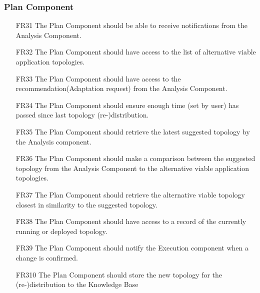 \subsubsection{\textbf{Plan Component}}
\begin{itemize}
    \item [FR31] The Plan Component should be able to receive notifications from the Analysis Component.
    \item [FR32] The Plan Component should have access to the list of alternative viable application topologies.
    \item [FR33] The Plan Component should have access to the recommendation(Adaptation request) from the Analysis Component.
    \item [FR34] The Plan Component should ensure enough time (set by user) has passed since last topology (re-)distribution.
    \item [FR35] The Plan Component should retrieve the latest suggested topology by the Analysis component.
    \item [FR36] The Plan Component should make a comparison between the suggested topology from the Analysis Component to the alternative viable application topologies.
    \item [FR37] The Plan Component should retrieve the alternative viable topology closest in similarity to the suggested topology.
    \item [FR38] The Plan Component should have access to a record of the currently running or deployed topology.
    \item [FR39] The Plan Component should notify the Execution component when a change is confirmed.
    \item [FR310] The Plan Component should store the new topology for the (re-)distribution to the Knowledge Base
\end{itemize}

